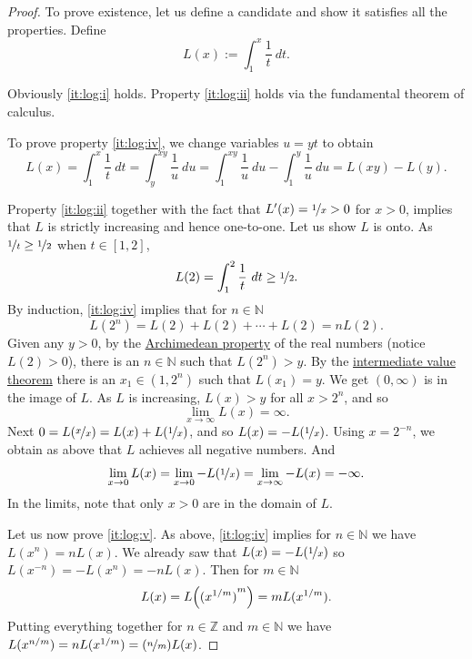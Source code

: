 \documentclass[12pt]{book}
\newcommand{\Z}{{\mathbb{Z}}}
\newcommand{\N}{{\mathbb{N}}}
\theoremstyle{plain}
\theoremstyle{remark}
\theoremstyle{definition}
\theoremstyle{exercise}
\theoremstyle{example}
\begin{document}
\begin{proof}
To prove existence, let us define a candidate and show it satisfies
all the properties.  Define
\begin{equation*}
L(x) := \int_1^x \frac{1}{t}~dt .
\end{equation*}

Obviously \ref{it:log:i} holds.  Property \ref{it:log:ii} holds
via the fundamental theorem of calculus.

To prove property \ref{it:log:iv},
we change variables $u=yt$ to obtain
\begin{equation*}
L(x) =
\int_1^{x} \frac{1}{t}~dt
=
\int_y^{xy} \frac{1}{u}~du
=
\int_1^{xy} \frac{1}{u}~du
-
\int_1^{y} \frac{1}{u}~du
=
L(xy)-L(y) .
\end{equation*}

Property \ref{it:log:ii} together with the fact that $L'(x) = \nicefrac{1}{x} > 0$ 
for $x > 0$, implies that $L$
is strictly increasing and hence one-to-one.
Let us show $L$ is onto.  
As $\nicefrac{1}{t} \geq \nicefrac{1}{2}$ when $t \in [1,2]$,
\begin{equation*}
L(2) = \int_1^2 \frac{1}{t} ~dt \geq \nicefrac{1}{2} .
\end{equation*}
By induction, \ref{it:log:iv} implies that for $n \in \N$
\begin{equation*}
L(2^n) = L(2) + L(2) + \cdots + L(2) = n L(2) .
\end{equation*}
Given any $y > 0$, 
by the \hyperref[thm:arch:i]{Archimedean property} of the real numbers
(notice $L(2) > 0$), there is an $n \in \N$ such that
$L(2^n) > y$.  By the
\hyperref[IVT:thm]{intermediate value theorem}
there is an $x_1 \in (1,2^n)$ such that $L(x_1) = y$.  We get
$(0,\infty)$ is in the image of $L$.
As $L$ is increasing, $L(x) > y$ for all $x > 2^n$, and so
\begin{equation*}
\lim_{x\to\infty} L(x) = \infty .
\end{equation*}
Next
$0 = L(\nicefrac{x}{x}) = L(x) + L(\nicefrac{1}{x})$, and
so $L(x) = - L(\nicefrac{1}{x})$.  Using $x=2^{-n}$, we obtain
as above that $L$ achieves all negative numbers.  And
\begin{equation*}
\lim_{x \to 0} L(x) = 
\lim_{x \to 0} -L(\nicefrac{1}{x})
=
\lim_{x \to \infty} -L(x)
=  - \infty .
\end{equation*}
In the limits, note that only $x > 0$ are in the domain of $L$.

Let us now prove \ref{it:log:v}.
As above, \ref{it:log:iv} implies for $n \in \N$ we have
$L(x^n) = n L(x)$.
We already saw that
$L(x) = - L(\nicefrac{1}{x})$
so $L(x^{-n}) = - L(x^n) = -n L(x)$.  Then for $m \in \N$
\begin{equation*}
L(x) = L\Bigl({(x^{1/m})}^m\Bigr) = m L(x^{1/m}) .
\end{equation*}
Putting everything together for $n \in \Z$ and $m \in \N$ we have
$L(x^{n/m}) = n L(x^{1/m}) = (\nicefrac{n}{m}) L(x)$.


\end{proof}
\end{document}
